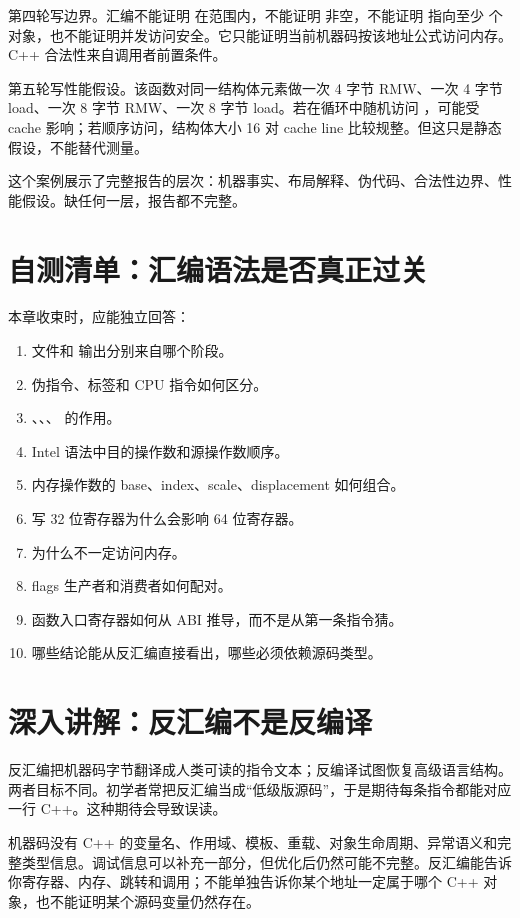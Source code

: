 第四轮写边界。汇编不能证明  在范围内，不能证明  非空，不能证明  指向至少  个对象，也不能证明并发访问安全。它只能证明当前机器码按该地址公式访问内存。C++ 合法性来自调用者前置条件。

第五轮写性能假设。该函数对同一结构体元素做一次 4 字节 RMW、一次 4 字节 load、一次 8 字节 RMW、一次 8 字节 load。若在循环中随机访问 ，可能受 cache 影响；若顺序访问，结构体大小 16 对 cache line 比较规整。但这只是静态假设，不能替代测量。

这个案例展示了完整报告的层次：机器事实、布局解释、伪代码、合法性边界、性能假设。缺任何一层，报告都不完整。

\section{自测清单：汇编语法是否真正过关}

本章收束时，应能独立回答：

\begin{enumerate}
  \item {} 文件和  输出分别来自哪个阶段。
  \item 伪指令、标签和 CPU 指令如何区分。
  \item {}、、、 的作用。
  \item Intel 语法中目的操作数和源操作数顺序。
  \item 内存操作数的 base、index、scale、displacement 如何组合。
  \item 写 32 位寄存器为什么会影响 64 位寄存器。
  \item {} 为什么不一定访问内存。
  \item flags 生产者和消费者如何配对。
  \item 函数入口寄存器如何从 ABI 推导，而不是从第一条指令猜。
  \item 哪些结论能从反汇编直接看出，哪些必须依赖源码类型。
\end{enumerate}

\section{深入讲解：反汇编不是反编译}

反汇编把机器码字节翻译成人类可读的指令文本；反编译试图恢复高级语言结构。两者目标不同。初学者常把反汇编当成“低级版源码”，于是期待每条指令都能对应一行 C++。这种期待会导致误读。

机器码没有 C++ 的变量名、作用域、模板、重载、对象生命周期、异常语义和完整类型信息。调试信息可以补充一部分，但优化后仍然可能不完整。反汇编能告诉你寄存器、内存、跳转和调用；不能单独告诉你某个地址一定属于哪个 C++ 对象，也不能证明某个源码变量仍然存在。

